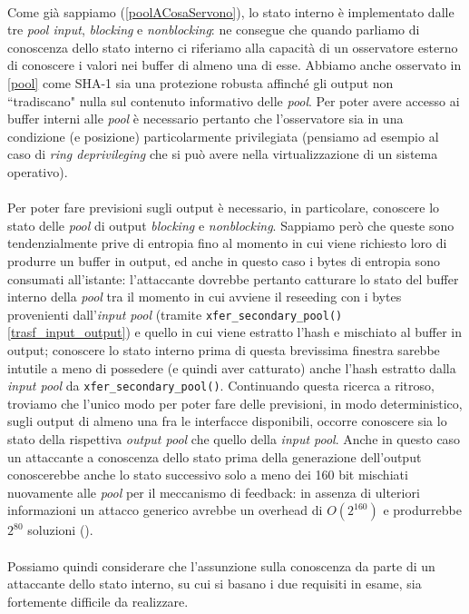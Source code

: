 \documentclass{article}
\begin{document}
 \paragraph{} Come già sappiamo (\ref{poolACosaServono}), lo stato interno è
 implementato dalle tre \emph{pool input}, \emph{blocking} e \emph{nonblocking}:
 ne consegue che quando parliamo di conoscenza dello stato interno ci riferiamo
 alla capacità di un osservatore esterno di conoscere i valori nei buffer di
 almeno una di esse. Abbiamo anche osservato in \ref{pool} come SHA-1 sia una
 protezione robusta affinché gli output non ``tradiscano" nulla sul
 contenuto informativo delle \emph{pool}. Per poter avere accesso ai buffer
 interni alle \emph{pool} è necessario pertanto che l'osservatore sia in una
 condizione (e posizione) particolarmente privilegiata (pensiamo ad esempio al
 caso di \emph{ring deprivileging} che si può avere nella virtualizzazione di un
 sistema operativo). 
 
 \paragraph{} Per poter fare previsioni sugli output è necessario, in
 particolare, conoscere lo stato delle \emph{pool} di output \emph{blocking} e
 \emph{nonblocking}. Sappiamo però che queste sono tendenzialmente prive di
 entropia fino al momento in cui viene richiesto loro di produrre un buffer in
 output, ed anche in questo caso i bytes di entropia sono consumati all'istante:
 l'attaccante dovrebbe pertanto catturare lo stato del buffer interno della
 \emph{pool} tra il momento in cui avviene il reseeding con i bytes provenienti
 dall'\emph{input pool} (tramite \verb+xfer_secondary_pool()+
 \ref{trasf_input_output}) e quello in cui viene estratto l'hash e mischiato al
 buffer in output; conoscere lo stato interno prima di questa brevissima
 finestra sarebbe intutile a meno di possedere (e quindi aver catturato) anche
 l'hash estratto dalla \emph{input pool} da \verb+xfer_secondary_pool()+.
 Continuando questa ricerca a ritroso, troviamo che l'unico modo per poter fare
 delle previsioni, in modo deterministico, sugli output di almeno una fra le
 interfacce disponibili, occorre conoscere sia lo stato della rispettiva
 \emph{output pool} che quello della \emph{input pool}. Anche in questo caso un
 attaccante a conoscenza dello stato prima della generazione dell'output
 conoscerebbe anche lo stato successivo solo a meno dei 160 bit mischiati
 nuovamente alle \emph{pool} per il meccanismo di feedback: in assenza di
 ulteriori informazioni un attacco generico avrebbe un overhead di $O(2^{160})$
 e produrrebbe $2^{80}$ soluzioni (\cite{lach}). \\\\
 Possiamo quindi considerare che l'assunzione sulla conoscenza da parte di un
 attaccante dello stato interno, su cui si basano i due requisiti in esame, sia
 fortemente difficile da realizzare.
 
\end{document}
